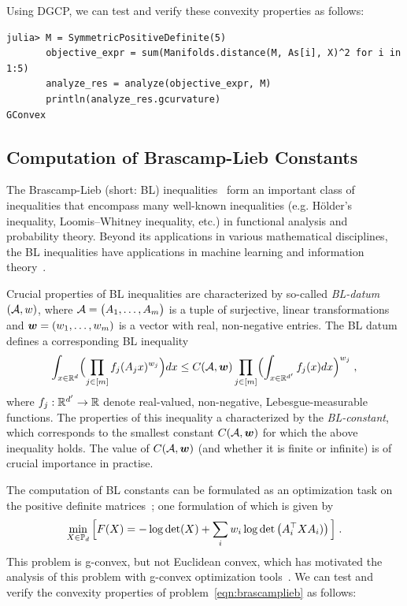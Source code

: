\documentclass[twoside,11pt]{article}
\begin{document}
Using DGCP, we can test and verify these convexity properties as follows:

\begin{listing}[h!]
    \begin{verbatim}
julia> M = SymmetricPositiveDefinite(5)
       objective_expr = sum(Manifolds.distance(M, As[i], X)^2 for i in 1:5)
       analyze_res = analyze(objective_expr, M)
       println(analyze_res.gcurvature)
GConvex
    \end{verbatim}
\end{listing}


\subsection{Computation of Brascamp-Lieb Constants}
The Brascamp-Lieb (short: BL) inequalities~\citep{BL1,BL2} form an important class of inequalities that encompass many well-known inequalities (e.g.  Hölder's inequality,  Loomis–Whitney inequality, etc.) in functional analysis and probability theory. Beyond its applications in various mathematical disciplines, the BL inequalities have applications in machine learning and information theory~\citep{dvir2016rank,pmlr-v30-Hardt13,carlen2009subadditivity,liu2016smoothing}.

Crucial properties of BL inequalities are characterized by so-called  \emph{BL-datum} $(\mathcal{A},w)$, where $\mathcal{A} = \big( A_1, \dots, A_m \big)$ is a tuple of surjective, linear transformations and  $\boldsymbol{w}=(w_1,\dots,w_m)$ is a vector with real, non-negative entries. The BL datum defines a corresponding BL inequality 
\begin{equation}\label{eq:BL-inequ}
\int_{x \in \mathbb{R}^d} \Bigl( \prod_{j \in [m]} f_j (A_j x)^{w_j} \Bigr) dx 
\leq C(\mathcal{A},\boldsymbol{w}) \prod_{j \in [m]} \Bigl( \int_{x \in \mathbb{R}^{d'}} f_j (x) dx	\Bigr)^{w_j} \; ,
\end{equation}
where $f_j: \mathbb{R}^{d'} \rightarrow \mathbb{R}$ denote real-valued, non-negative, Lebesgue-measurable functions. The properties of this inequality a characterized by the \emph{BL-constant}, which corresponds to the smallest constant $C(\mathcal{A},\boldsymbol{w})$ for which the above inequality holds. The value of $C(\mathcal{A},\boldsymbol{w})$ (and whether it is finite or infinite) is of crucial importance in practise. 

The computation of BL constants can be formulated as 
an optimization task on the positive definite matrices~\citep{BL1,BL2}; one formulation of which is given by~\citep{sra_brascamplieb} 
\begin{equation}
\label{eqn:brascamplieb}
    \min_{X \in \mathbb{P}_d} \Big[ F(X)=-\log \operatorname{det}(X)+\sum_i w_i \log \operatorname{det}\left(A_i^\top X A_i)\right) \Big] \; .
\end{equation}
This problem is g-convex, but not Euclidean convex, which has motivated the analysis of this problem with g-convex optimization tools~\citep{gurvits,garg2018algorithmic,burgisser2018efficient,thompson}.
We can test and verify the convexity properties of problem~\ref{eqn:brascamplieb} as follows:
\end{document}
